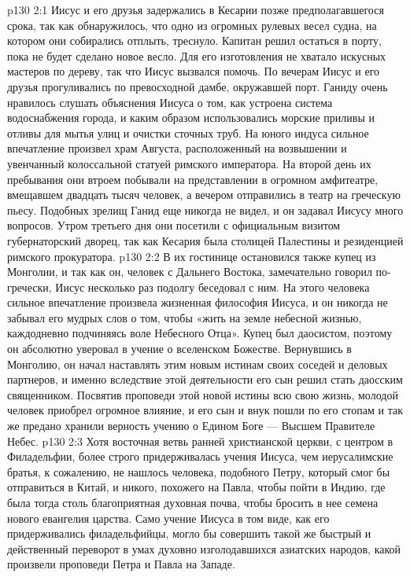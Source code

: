 \vs p130 2:1 Иисус и его друзья задержались в Кесарии позже предполагавшегося срока, так как обнаружилось, что одно из огромных рулевых весел судна, на котором они собирались отплыть, треснуло. Капитан решил остаться в порту, пока не будет сделано новое весло. Для его изготовления не хватало искусных мастеров по дереву, так что Иисус вызвался помочь. По вечерам Иисус и его друзья прогуливались по превосходной дамбе, окружавшей порт. Ганиду очень нравилось слушать объяснения Иисуса о том, как устроена система водоснабжения города, и каким образом использовались морские приливы и отливы для мытья улиц и очистки сточных труб. На юного индуса сильное впечатление произвел храм Августа, расположенный на возвышении и увенчанный колоссальной статуей римского императора. На второй день их пребывания они втроем побывали на представлении в огромном амфитеатре, вмещавшем двадцать тысяч человек, а вечером отправились в театр на греческую пьесу. Подобных зрелищ Ганид еще никогда не видел, и он задавал Иисусу много вопросов. Утром третьего дня они посетили с официальным визитом губернаторский дворец, так как Кесария была столицей Палестины и резиденцией римского прокуратора.
\vs p130 2:2 \pc В их гостинице остановился также купец из Монголии, и так как он, человек с Дальнего Востока, замечательно говорил по\hyp{}гречески, Иисус несколько раз подолгу беседовал с ним. На этого человека сильное впечатление произвела жизненная философия Иисуса, и он никогда не забывал его мудрых слов о том, чтобы «жить на земле небесной жизнью, каждодневно подчиняясь воле Небесного Отца». Купец был даосистом, поэтому он абсолютно уверовал в учение о вселенском Божестве. Вернувшись в Монголию, он начал наставлять этим новым истинам своих соседей и деловых партнеров, и именно вследствие этой деятельности его сын решил стать даосским священником. Посвятив проповеди этой новой истины всю свою жизнь, молодой человек приобрел огромное влияние, и его сын и внук пошли по его стопам и так же предано хранили верность учению о Едином Боге --- Высшем Правителе Небес.
\vs p130 2:3 Хотя восточная ветвь ранней христианской церкви, с центром в Филадельфии, более строго придерживалась учения Иисуса, чем иерусалимские братья, к сожалению, не нашлось человека, подобного Петру, который смог бы отправиться в Китай, и никого, похожего на Павла, чтобы пойти в Индию, где была тогда столь благоприятная духовная почва, чтобы бросить в нее семена нового евангелия царства. Само учение Иисуса в том виде, как его придерживались филадельфийцы, могло бы совершить такой же быстрый и действенный переворот в умах духовно изголодавшихся азиатских народов, какой произвели проповеди Петра и Павла на Западе.
